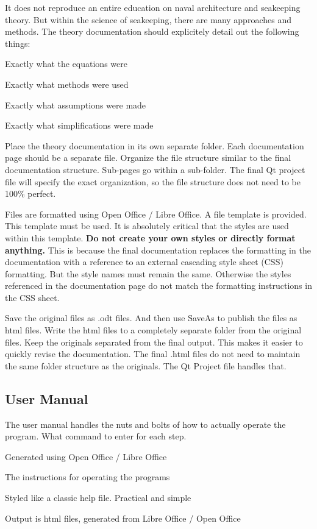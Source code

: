 It does not reproduce an entire education on naval architecture and seakeeping theory. But within the science of seakeeping, there are many approaches and methods. The theory documentation should explicitely detail out the following things\-:


\begin{DoxyEnumerate}
\item Exactly what the equations were
\item Exactly what methods were used
\item Exactly what assumptions were made
\item Exactly what simplifications were made
\end{DoxyEnumerate}

Place the theory documentation in its own separate folder. Each documentation page should be a separate file. Organize the file structure similar to the final documentation structure. Sub-\/pages go within a sub-\/folder. The final Qt project file will specify the exact organization, so the file structure does not need to be 100\% perfect.

Files are formatted using Open Office / Libre Office. A file template is provided. This template must be used. It is absolutely critical that the styles are used within this template. {\bfseries Do not create your own styles or directly format anything.} This is because the final documentation replaces the formatting in the documentation with a reference to an external cascading style sheet (C\-S\-S) formatting. But the style names must remain the same. Otherwise the styles referenced in the documentation page do not match the formatting instructions in the C\-S\-S sheet.

Save the original files as .odt files. And then use Save\-As to publish the files as html files. Write the html files to a completely separate folder from the original files. Keep the originals separated from the final output. This makes it easier to quickly revise the documentation. The final .html files do not need to maintain the same folder structure as the originals. The Qt Project file handles that.\hypertarget{documentation_documentation_user}{}\subsection{User Manual}\label{documentation_documentation_user}
The user manual handles the nuts and bolts of how to actually operate the program. What command to enter for each step.
\begin{DoxyItemize}
\item Generated using Open Office / Libre Office
\item The instructions for operating the programs
\item Styled like a classic help file. Practical and simple
\item Output is html files, generated from Libre Office / Open Office
\end{DoxyItemize}


